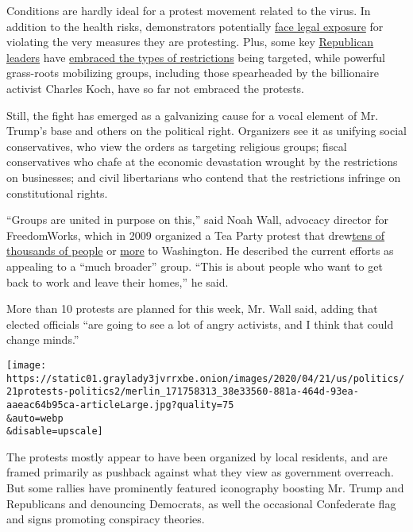Conditions are hardly ideal for a protest movement related to the virus.
In addition to the health risks, demonstrators potentially
\href{https://www.nj.com/coronavirus/2020/04/woman-charged-for-organizing-protest-of-murphys-coronavirus-stay-at-home-order.html}{face
legal exposure} for violating the very measures they are protesting.
Plus, some key
\href{https://www.nytimes3xbfgragh.onion/2020/04/03/us/politics/maryland-coronavirus.html}{Republican
leaders} have
\href{https://www.nytimes3xbfgragh.onion/2020/03/16/us/politics/virus-primary-2020-ohio.html}{embraced
the types of restrictions} being targeted, while powerful grass-roots
mobilizing groups, including those spearheaded by the billionaire
activist Charles Koch, have so far not embraced the protests.

Still, the fight has emerged as a galvanizing cause for a vocal element
of Mr. Trump's base and others on the political right. Organizers see it
as unifying social conservatives, who view the orders as targeting
religious groups; fiscal conservatives who chafe at the economic
devastation wrought by the restrictions on businesses; and civil
libertarians who contend that the restrictions infringe on
constitutional rights.

``Groups are united in purpose on this,'' said Noah Wall, advocacy
director for FreedomWorks, which in 2009 organized a Tea Party protest
that
drew\href{https://www.politico.com/story/2009/09/a-march-but-is-it-a-movement-027058}{tens
of thousands of people} or
\href{https://www.latimes.com/archives/la-xpm-2009-sep-15-na-crowd15-story.html}{more}
to Washington. He described the current efforts as appealing to a ``much
broader'' group. ``This is about people who want to get back to work and
leave their homes,'' he said.

More than 10 protests are planned for this week, Mr. Wall said, adding
that elected officials ``are going to see a lot of angry activists, and
I think that could change minds.''

\texttt{[image: https://static01.graylady3jvrrxbe.onion/images/2020/04/21/us/politics/21protests-politics2/merlin\_171758313\_38e33560-881a-464d-93ea-aaeac64b95ca-articleLarge.jpg?quality=75\\\&auto=webp\\\&disable=upscale]}

The protests mostly appear to have been organized by local residents,
and are framed primarily as pushback against what they view as
government overreach. But some rallies have prominently featured
iconography boosting Mr. Trump and Republicans and denouncing Democrats,
as well the occasional Confederate flag and signs promoting conspiracy
theories.

